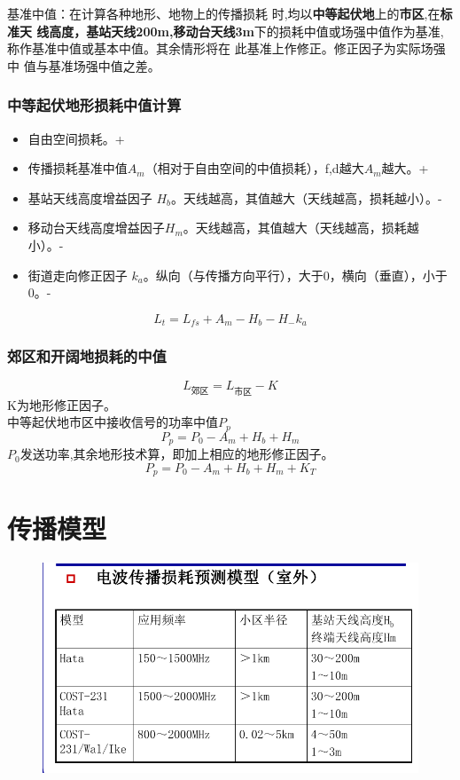 基准中值：在计算各种地形、地物上的传播损耗
时,均以\textbf{中等起伏地}上的\textbf{市区},在\textbf{标准天
线高度，基站天线200m,移动台天线3m}下的损耗中值或场强中值作为基准,
称作基准中值或基本中值。其余情形将在
此基准上作修正。修正因子为实际场强中
值与基准场强中值之差。

\subsubsection{中等起伏地形损耗中值计算}
\begin{itemize}
	\item 自由空间损耗。+
	\item 传播损耗基准中值$A_m$（相对于自由空间的中值损耗），f,d越大$A_m$越大。+
	\item 基站天线高度增益因子 $ H_b $。天线越高，其值越大（天线越高，损耗越小）。-
	\item 移动台天线高度增益因子$ H_m $。天线越高，其值越大（天线越高，损耗越小）。-
	\item 街道走向修正因子 $ k_a $。纵向（与传播方向平行），大于0，横向（垂直），小于0。-
\end{itemize}
\begin{equation}\label{key}
L_t = L_{fs} + A_m - H_b - H_ -k_a
\end{equation}

\subsubsection{郊区和开阔地损耗的中值
}
\begin{equation}\label{key}
L_{\text{郊区}} = L_{\text{市区}} - K
\end{equation}
K为地形修正因子。\\
中等起伏地市区中接收信号的功率中值$ P_p $
\begin{equation}\label{key}
 P_p = P_0 - A_m + H_b + H_m
\end{equation}
$ P_0 $发送功率,其余地形技术算，即加上相应的地形修正因子。
\begin{equation}\label{key}
 P_p = P_0 - A_m + H_b + H_m+K_T
\end{equation}

\section{传播模型}
\begin{figure}[H]
	\centering
	\includegraphics[width=0.7\linewidth]{figures/传播模型}
	\caption{}
	\label{fig:}
\end{figure}
